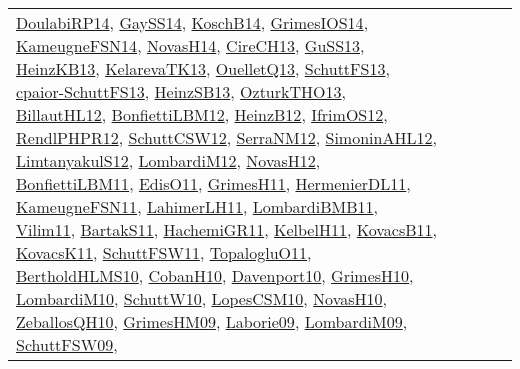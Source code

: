 {\begin{longtable}{llp{6cm}p{6cm}p{6cm}}
\href{papers/DoulabiRP14.pdf}{DoulabiRP14}\cite{DoulabiRP14}, \href{papers/GaySS14.pdf}{GaySS14}\cite{GaySS14}, \href{papers/KoschB14.pdf}{KoschB14}\cite{KoschB14}, \href{articles/GrimesIOS14.pdf}{GrimesIOS14}\cite{GrimesIOS14}, \href{articles/KameugneFSN14.pdf}{KameugneFSN14}\cite{KameugneFSN14}, \href{articles/NovasH14.pdf}{NovasH14}\cite{NovasH14}, \href{papers/CireCH13.pdf}{CireCH13}\cite{CireCH13}, \href{papers/GuSS13.pdf}{GuSS13}\cite{GuSS13}, \href{papers/HeinzKB13.pdf}{HeinzKB13}\cite{HeinzKB13}, \href{papers/KelarevaTK13.pdf}{KelarevaTK13}\cite{KelarevaTK13}, \href{papers/OuelletQ13.pdf}{OuelletQ13}\cite{OuelletQ13}, \href{papers/SchuttFS13.pdf}{SchuttFS13}\cite{SchuttFS13}, \href{papers/cpaior-SchuttFS13.pdf}{cpaior-SchuttFS13}\cite{cpaior-SchuttFS13}, \href{articles/HeinzSB13.pdf}{HeinzSB13}\cite{HeinzSB13}, \href{articles/OzturkTHO13.pdf}{OzturkTHO13}\cite{OzturkTHO13}, \href{papers/BillautHL12.pdf}{BillautHL12}\cite{BillautHL12}, \href{papers/BonfiettiLBM12.pdf}{BonfiettiLBM12}\cite{BonfiettiLBM12}, \href{papers/HeinzB12.pdf}{HeinzB12}\cite{HeinzB12}, \href{papers/IfrimOS12.pdf}{IfrimOS12}\cite{IfrimOS12}, \href{papers/RendlPHPR12.pdf}{RendlPHPR12}\cite{RendlPHPR12}, \href{papers/SchuttCSW12.pdf}{SchuttCSW12}\cite{SchuttCSW12}, \href{papers/SerraNM12.pdf}{SerraNM12}\cite{SerraNM12}, \href{papers/SimoninAHL12.pdf}{SimoninAHL12}\cite{SimoninAHL12}, \href{articles/LimtanyakulS12.pdf}{LimtanyakulS12}\cite{LimtanyakulS12}, \href{articles/LombardiM12.pdf}{LombardiM12}\cite{LombardiM12}, \href{articles/NovasH12.pdf}{NovasH12}\cite{NovasH12}, \href{papers/BonfiettiLBM11.pdf}{BonfiettiLBM11}\cite{BonfiettiLBM11}, \href{papers/EdisO11.pdf}{EdisO11}\cite{EdisO11}, \href{papers/GrimesH11.pdf}{GrimesH11}\cite{GrimesH11}, \href{papers/HermenierDL11.pdf}{HermenierDL11}\cite{HermenierDL11}, \href{papers/KameugneFSN11.pdf}{KameugneFSN11}\cite{KameugneFSN11}, \href{papers/LahimerLH11.pdf}{LahimerLH11}\cite{LahimerLH11}, \href{papers/LombardiBMB11.pdf}{LombardiBMB11}\cite{LombardiBMB11}, \href{papers/Vilim11.pdf}{Vilim11}\cite{Vilim11}, \href{articles/BartakS11.pdf}{BartakS11}\cite{BartakS11}, \href{articles/HachemiGR11.pdf}{HachemiGR11}\cite{HachemiGR11}, \href{articles/KelbelH11.pdf}{KelbelH11}\cite{KelbelH11}, \href{articles/KovacsB11.pdf}{KovacsB11}\cite{KovacsB11}, \href{articles/KovacsK11.pdf}{KovacsK11}\cite{KovacsK11}, \href{articles/SchuttFSW11.pdf}{SchuttFSW11}\cite{SchuttFSW11}, \href{articles/TopalogluO11.pdf}{TopalogluO11}\cite{TopalogluO11}, \href{papers/BertholdHLMS10.pdf}{BertholdHLMS10}\cite{BertholdHLMS10}, \href{papers/CobanH10.pdf}{CobanH10}\cite{CobanH10}, \href{papers/Davenport10.pdf}{Davenport10}\cite{Davenport10}, \href{papers/GrimesH10.pdf}{GrimesH10}\cite{GrimesH10}, \href{papers/LombardiM10.pdf}{LombardiM10}\cite{LombardiM10}, \href{papers/SchuttW10.pdf}{SchuttW10}\cite{SchuttW10}, \href{articles/LopesCSM10.pdf}{LopesCSM10}\cite{LopesCSM10}, \href{articles/NovasH10.pdf}{NovasH10}\cite{NovasH10}, \href{articles/ZeballosQH10.pdf}{ZeballosQH10}\cite{ZeballosQH10}, \href{papers/GrimesHM09.pdf}{GrimesHM09}\cite{GrimesHM09}, \href{papers/Laborie09.pdf}{Laborie09}\cite{Laborie09}, \href{papers/LombardiM09.pdf}{LombardiM09}\cite{LombardiM09}, \href{papers/SchuttFSW09.pdf}{SchuttFSW09}\cite{SchuttFSW09}, 
\end{longtable}}
